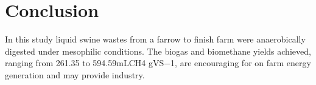 \section{Conclusion}
In this study liquid swine wastes from a farrow to finish farm were anaerobically digested under mesophilic conditions. The biogas and biomethane yields achieved, ranging from 261.35 to 594.59mLCH4 gVS−1, are encouraging for on farm energy generation and may provide industry.